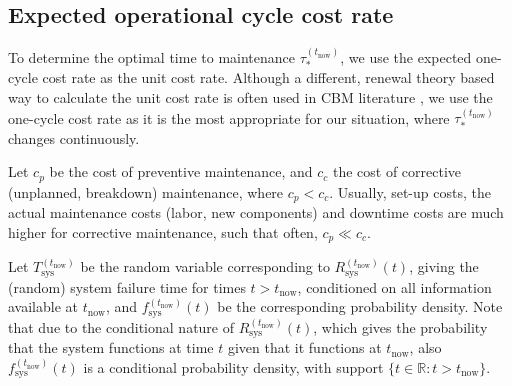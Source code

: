 \documentclass[authoryear]{elsarticle}
\newcommand{\reals}{\mathbb{R}}
\def\tnow{t_\text{now}}
\newcommand{\Rsysnow}{R^{(t_\text{now})}_\text{sys}}
\newcommand{\Tsysnow}{T^{(t_\text{now})}_\text{sys}}
\newcommand{\fsysnow}{f^{(t_\text{now})}_\text{sys}}
\newcommand{\tausnow}{\tau_*^{(\tnow)}}
\begin{document}
\subsection{Expected operational cycle cost rate}
\label{sec:costrate}

To determine the optimal time to maintenance $\tausnow$,
we use the expected one-cycle cost rate 
\citep{1984:ansell-bendell-humble,1996:mazzuchi-soyer,2006:coolen-schrijner-coolen}
as the unit cost rate.
Although a different, renewal theory based way to calculate the unit cost rate is often used
in CBM literature \citep[e.g.,][]{2013:si-et-al,2011:kim-et-al},
we use the one-cycle cost rate as it is the most appropriate for our situation,
where $\tausnow$ changes continuously.

Let $c_p$ be the cost of preventive maintenance, and $c_c$ the cost of corrective (unplanned, breakdown) maintenance, where $c_p < c_c$.
Usually, set-up costs, the actual maintenance costs (labor, new components) and downtime costs are much higher for corrective maintenance,
such that often, $c_p \ll c_c$.

Let $\Tsysnow$ be the random variable corresponding to $\Rsysnow(t)$,
giving the (random) system failure time for times $t > \tnow$,
conditioned on all information available at $\tnow$,
and $\fsysnow(t)$ be the corresponding probability density.
Note that due to the conditional nature of $\Rsysnow(t)$,
which gives the probability that the system functions at time $t$ given that it functions at $\tnow$,
also $\fsysnow(t)$ is a conditional probability density,
with support $\{t \in \reals : t > \tnow \}$.
\end{document}

